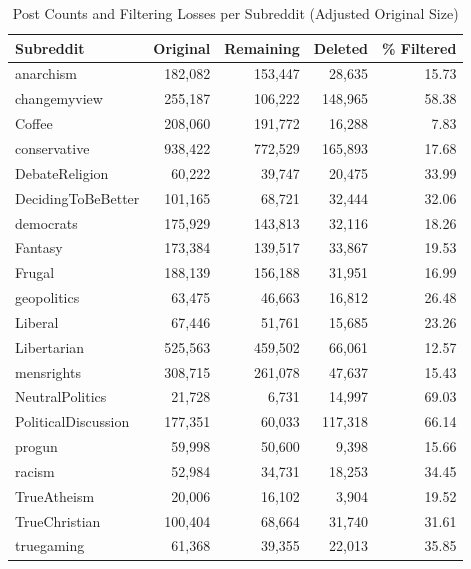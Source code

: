 \begin{table}[htbp]
\centering
\small
\caption{Post Counts and Filtering Losses per Subreddit (Adjusted Original Size)}
\label{tab:subreddit_filtering}
\begin{tabular}{lrrrr}
\hline
\textbf{Subreddit} & \textbf{Original} & \textbf{Remaining} & \textbf{Deleted} & \textbf{\% Filtered} \\
\hline
anarchism & 182{,}082 & 153{,}447 & 28{,}635 & 15.73 \\
changemyview & 255{,}187 & 106{,}222 & 148{,}965 & 58.38 \\
Coffee & 208{,}060 & 191{,}772 & 16{,}288 & 7.83 \\
conservative & 938{,}422 & 772{,}529 & 165{,}893 & 17.68 \\
DebateReligion & 60{,}222 & 39{,}747 & 20{,}475 & 33.99 \\
DecidingToBeBetter & 101{,}165 & 68{,}721 & 32{,}444 & 32.06 \\
democrats & 175{,}929 & 143{,}813 & 32{,}116 & 18.26 \\
Fantasy & 173{,}384 & 139{,}517 & 33{,}867 & 19.53 \\
Frugal & 188{,}139 & 156{,}188 & 31{,}951 & 16.99 \\
geopolitics & 63{,}475 & 46{,}663 & 16{,}812 & 26.48 \\
Liberal & 67{,}446 & 51{,}761 & 15{,}685 & 23.26 \\
Libertarian & 525{,}563 & 459{,}502 & 66{,}061 & 12.57 \\
mensrights & 308{,}715 & 261{,}078 & 47{,}637 & 15.43 \\
NeutralPolitics & 21{,}728 & 6{,}731 & 14{,}997 & 69.03 \\
PoliticalDiscussion & 177{,}351 & 60{,}033 & 117{,}318 & 66.14 \\
progun & 59{,}998 & 50{,}600 & 9{,}398 & 15.66 \\
racism & 52{,}984 & 34{,}731 & 18{,}253 & 34.45 \\
TrueAtheism & 20{,}006 & 16{,}102 & 3{,}904 & 19.52 \\
TrueChristian & 100{,}404 & 68{,}664 & 31{,}740 & 31.61 \\
truegaming & 61{,}368 & 39{,}355 & 22{,}013 & 35.85 \\
\hline
\end{tabular}
\end{table}


